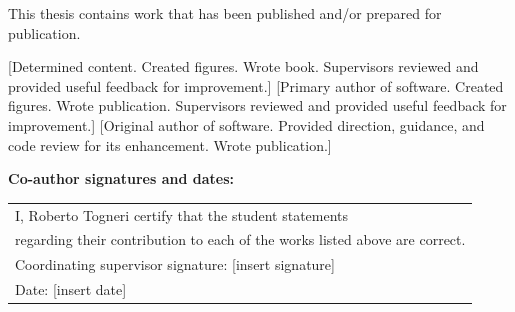 \documentclass{book}
\begin{document}
\begin{flushleft}
	This thesis contains work that has been published and/or prepared for publication.

	[Determined content. Created figures. Wrote book. Supervisors reviewed and provided useful feedback for improvement.]
	[Primary author of software. Created figures. Wrote publication. Supervisors reviewed and provided useful feedback for improvement.]
	[Original author of software. Provided direction, guidance, and code review for its enhancement. Wrote publication.]
	
	\vfill
	\textbf{Co-author signatures and dates:} 
	\vspace{5cm}
	
	\vskip 0.5cm
	\begin{tabular}{l}
		I, Roberto Togneri certify that the student statements \\ regarding their contribution to each of the works listed above are correct. \\
		Coordinating supervisor signature: {[insert signature]}\\
		Date: {[insert date]}
	\end{tabular}
	\vspace{3cm}
\end{flushleft}
\end{document}
